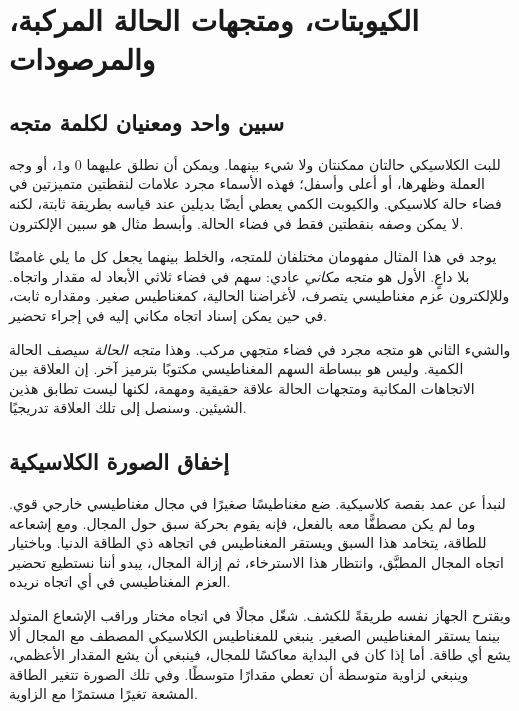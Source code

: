 \chapter{الكيوبتات، ومتجهات الحالة المركبة، والمرصودات}


\section{سبين واحد ومعنيان لكلمة متجه}

للبت الكلاسيكي حالتان ممكنتان ولا شيء بينهما. ويمكن أن نطلق عليهما \(0\) و\(1\)، أو وجه العملة وظهرها، أو أعلى وأسفل؛ فهذه الأسماء مجرد علامات لنقطتين متميزتين في فضاء حالة كلاسيكي. والكيوبت الكمي يعطي أيضًا بديلين عند قياسه بطريقة ثابتة، لكنه لا يمكن وصفه بنقطتين فقط في فضاء الحالة. وأبسط مثال هو سبين الإلكترون.

يوجد في هذا المثال مفهومان مختلفان للمتجه، والخلط بينهما يجعل كل ما يلي غامضًا بلا داعٍ. الأول هو \emph{متجه مكاني} عادي: سهم في فضاء ثلاثي الأبعاد له مقدار واتجاه. وللإلكترون عزم مغناطيسي يتصرف، لأغراضنا الحالية، كمغناطيس صغير. ومقداره ثابت، في حين يمكن إسناد اتجاه مكاني إليه في إجراء تحضير.

والشيء الثاني هو متجه مجرد في فضاء متجهي مركب. وهذا \emph{متجه الحالة} سيصف الحالة الكمية. وليس هو ببساطة السهم المغناطيسي مكتوبًا بترميز آخر. إن العلاقة بين الاتجاهات المكانية ومتجهات الحالة علاقة حقيقية ومهمة، لكنها ليست تطابق هذين الشيئين. وسنصل إلى تلك العلاقة تدريجيًا.

\section{إخفاق الصورة الكلاسيكية}

لنبدأ عن عمد بقصة كلاسيكية. ضع مغناطيسًا صغيرًا في مجال مغناطيسي خارجي قوي. وما لم يكن مصطفًّا معه بالفعل، فإنه يقوم بحركة سبق حول المجال. ومع إشعاعه للطاقة، يتخامد هذا السبق ويستقر المغناطيس في اتجاهه ذي الطاقة الدنيا. وباختيار اتجاه المجال المطبَّق، وانتظار هذا الاسترخاء، ثم إزالة المجال، يبدو أننا نستطيع تحضير العزم المغناطيسي في أي اتجاه نريده.

ويقترح الجهاز نفسه طريقةً للكشف. شغّل مجالًا في اتجاه مختار وراقب الإشعاع المتولد بينما يستقر المغناطيس الصغير. ينبغي للمغناطيس الكلاسيكي المصطف مع المجال ألا يشع أي طاقة. أما إذا كان في البداية معاكسًا للمجال، فينبغي أن يشع المقدار الأعظمي، وينبغي لزاوية متوسطة أن تعطي مقدارًا متوسطًا. وفي تلك الصورة تتغير الطاقة المشعة تغيرًا مستمرًا مع الزاوية.


